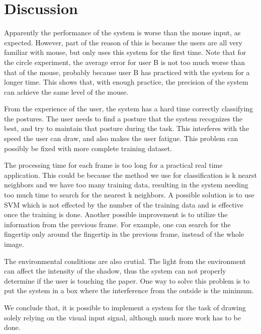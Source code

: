 \section{Discussion}
Apparently the performance of the system is worse than the mouse input, as expected. However, part of the reason of this is because the users are all very familiar with mouse, but only uses this system for the first time. Note that for the circle experiment, the average error for user B is not too much worse than that of the mouse, probably because user B has practiced with the system for a longer time. This shows that, with enough practice, the precision of the system can achieve the same level of the mouse. 

From the experience of the user, the system has a hard time correctly classifying the postures. The user needs to find a posture that the system recognizes the best, and try to maintain that posture during the task. This interferes with the speed the user can draw, and also makes the user fatigue. This problem can possibly be fixed with more complete training dataset. 

The processing time for each frame is too long for a practical real time application. This could be because the method we use for classification is k nearst neighbors and we have too many training data, resulting in the system needing too much time to search for the nearest k neighbors. A possible solution is to use SVM which is not effected by the number of the training data and is effective once the training is done. Another possible improvement is to utilize the information from the previous frame. For example, one can search for the fingertip only around the fingertip in the previous frame, instead of the whole image. 

The environmental conditions are also crutial. The light from the environment can affect the intensity of the shadow, thus the system can not properly determine if the user is touching the paper. One way to solve this problem is to put the system in a box where the interference from the outside is the minimum. 

We conclude that, it is possible to implement a system for the task of drawing solely relying on the visual input signal, although much more work has to be done. 